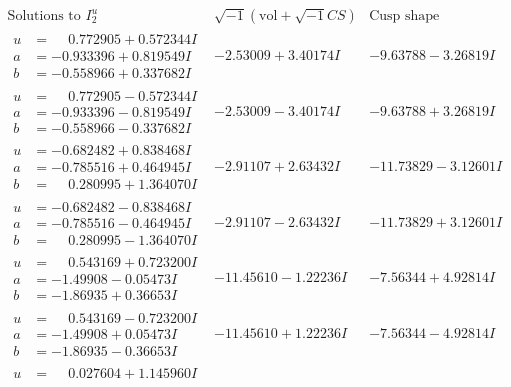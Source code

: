 \documentclass[1p]{elsarticle_modified}
\theoremstyle{definition}
\newcommand{\I}{\sqrt{-1}}
\begin{document}
$$\begin{array}{c|c|c}  
\text{Solutions to }I^u_{2}& \I (\text{vol} + \sqrt{-1}CS) & \text{Cusp shape}\\
 \hline 
\begin{aligned}
u &= \phantom{-}0.772905 + 0.572344 I \\
a &= -0.933396 + 0.819549 I \\
b &= -0.558966 + 0.337682 I\end{aligned}
 & -2.53009 + 3.40174 I & -9.63788 - 3.26819 I \\ \hline\begin{aligned}
u &= \phantom{-}0.772905 - 0.572344 I \\
a &= -0.933396 - 0.819549 I \\
b &= -0.558966 - 0.337682 I\end{aligned}
 & -2.53009 - 3.40174 I & -9.63788 + 3.26819 I \\ \hline\begin{aligned}
u &= -0.682482 + 0.838468 I \\
a &= -0.785516 + 0.464945 I \\
b &= \phantom{-}0.280995 + 1.364070 I\end{aligned}
 & -2.91107 + 2.63432 I & -11.73829 - 3.12601 I \\ \hline\begin{aligned}
u &= -0.682482 - 0.838468 I \\
a &= -0.785516 - 0.464945 I \\
b &= \phantom{-}0.280995 - 1.364070 I\end{aligned}
 & -2.91107 - 2.63432 I & -11.73829 + 3.12601 I \\ \hline\begin{aligned}
u &= \phantom{-}0.543169 + 0.723200 I \\
a &= -1.49908 - 0.05473 I \\
b &= -1.86935 + 0.36653 I\end{aligned}
 & -11.45610 - 1.22236 I & -7.56344 + 4.92814 I \\ \hline\begin{aligned}
u &= \phantom{-}0.543169 - 0.723200 I \\
a &= -1.49908 + 0.05473 I \\
b &= -1.86935 - 0.36653 I\end{aligned}
 & -11.45610 + 1.22236 I & -7.56344 - 4.92814 I \\ \hline\begin{aligned}
u &= \phantom{-}0.027604 + 1.145960 I \\

\end{aligned}
\end{array}$$
\end{document}
